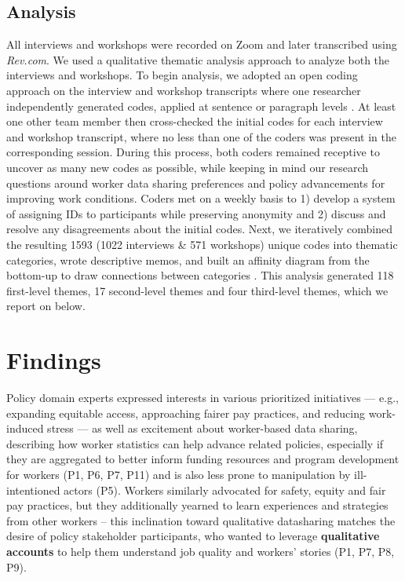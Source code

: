 \subsection{Analysis}\label{h.yglm2551dqq7} All interviews and workshops were recorded on Zoom and later transcribed using \emph{Rev.com}. We used a qualitative thematic analysis approach \cite{WMCa} to analyze both the interviews and workshops. To begin analysis, we adopted an open coding approach on the interview and workshop transcripts where one researcher independently generated codes, applied at sentence or paragraph levels \cite{C5bR,yWbe,WMCa,CQOi,T92p}. At least one other team member then cross-checked the initial codes for each interview and workshop transcript, where no less than one of the coders was present in the corresponding session. During this process, both coders remained receptive to uncover as many new codes as possible, while keeping in mind our research questions around worker data sharing preferences and policy advancements for improving work conditions. Coders met on a weekly basis to 1) develop a system of assigning IDs to participants while preserving anonymity and 2) discuss and resolve any disagreements about the initial codes. Next, we iteratively combined the resulting 1593 (1022 interviews \& 571 workshops) unique codes into thematic categories, wrote descriptive memos, and built an affinity diagram from the bottom-up to draw connections between categories \cite{uTeY,sQQh}. This analysis generated 118 first-level themes, 17 second-level themes{ and} four third-level themes, which we report on {below}.


\section{Findings}

{Policy domain experts expressed interests in various prioritized initiatives --- e.g., expanding equitable access, approaching fairer pay practices, and reducing work-induced stress --- as well as excitement about worker-based data sharing, describing how worker statistics can help advance related policies, especially if they are aggregated to better inform funding resources and program development for workers (P1, P6, P7, P11) and is also less prone to manipulation by ill-intentioned actors (P5). Workers similarly advocated for safety, equity and fair pay practices, but they additionally yearned to learn experiences and strategies from other workers -- this inclination toward qualitative datasharing matches the desire of policy stakeholder participants, who
wanted to leverage \textbf{qualitative accounts} to help them understand job quality and workers' stories (P1, P7, P8, P9). }

